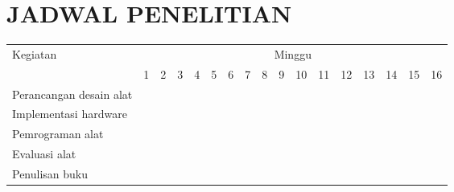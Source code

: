 \chapter{JADWAL PENELITIAN}

\newcommand{\w}{}
\newcommand{\G}{\cellcolor{gray}}
\begin{table}[H]
  \label{tbl:timeline}
  \begin{tabular}{|p{3.5cm}|c|c|c|c|c|c|c|c|c|c|c|c|c|c|c|c|}

    \hline
    \multirow{2}{*}{Kegiatan} & \multicolumn{16}{|c|}{Minggu}                                                                       \\
    \cline{2-17}              &
    1                         & 2                             & 3  & 4  & 5  & 6  & 7  & 8  & 9  & 10 & 11 & 12 & 13 & 14 & 15 & 16 \\
    \hline

    Perancangan desain alat          &
    \G                        & \G                            & \w & \w & \w & \w & \w & \w & \w & \w & \w & \w & \w & \w & \w & \w \\
    \hline

    Implementasi hardware           &
    \w                        & \w                            & \G & \G & \G & \G & \G & \G & \w & \w & \w & \w & \w & \w & \w & \w \\
    \hline

    Pemrograman alat             &
    \w                        & \w                            & \w & \w & \w & \w & \w & \w & \G & \G & \G & \G & \G & \G & \w & \w \\
    \hline

    Evaluasi alat       &
    \w                        & \w                            & \w & \w & \w & \w & \w & \w & \w & \w & \w & \w & \G & \G & \G & \G \\
    \hline

    Penulisan buku           &
    \w                        & \w                            & \w & \w & \w & \w & \w & \w & \w & \w & \G & \G & \G & \G & \G & \G \\
    \hline
  \end{tabular}
\end{table}

